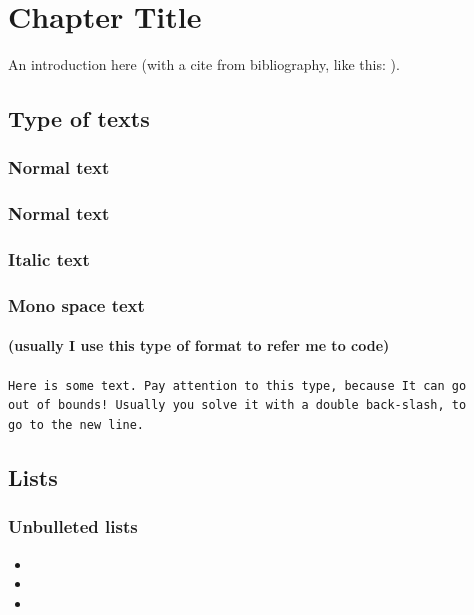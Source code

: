 \chapter{Chapter Title}

An introduction here (with a cite from bibliography, like this: \cite{greenwade93}).
\section{Type of texts}
\subsection{Normal text}
\lipsum[1]

\subsection{Normal text}
\textbf{\lipsum[1]}

\subsection{Italic text}
\textit{\lipsum[1]}

\subsection{Mono space text}
\subsubsection{(usually I use this type of format to refer me to code)}
\texttt{Here is some text. Pay attention to this type, because It can go 
\\ out of bounds! Usually you solve it with a double back-slash, to 
\\ go to the new line.}

\section{Lists}
\subsection{Unbulleted lists}
\begin{itemize}
    \item \lipsum[1]
    \item \lipsum[1]
    \item \lipsum[1]
\end{itemize}

